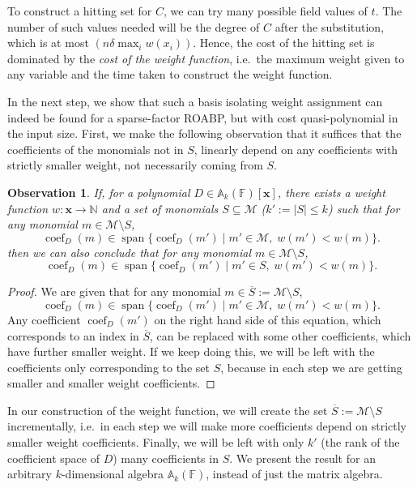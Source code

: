 \documentclass[final,oneeqnum, onethmnum, onefignum]{siamltex1213}
\newcommand{\N}{\mathbb N}
\newcommand{\A}{\mathbb A}
\newcommand{\F}{\mathbb F}
\newcommand{\abs}[1]{\lvert #1 \rvert}
\newcommand{\M}{\mathcal M}
\newcommand{\degree}{\delta} %
\newcommand{\coeff}{\operatorname{coef}}
\DeclareMathOperator{\Span}{span}
\newcommand{\x}{\mathbf{x}}
\renewcommand{\o}[1]{\overline{#1}}
\newtheorem{observation}[theorem]{Observation}
\begin{document}
To construct a hitting set for $C$, we can try many possible field values
of $t$. The number of such values needed will be the degree of $C$
after the substitution, which is at most $(n \degree \max_{i} w(x_i))$.
Hence, the cost of the hitting set is dominated by the 
{\em cost of the weight function}, i.e.\ the maximum weight given to any variable
and the time taken to construct the weight function.

In the next step, we show that such a basis isolating weight assignment
can indeed be found for a sparse-factor ROABP,
but with cost quasi-polynomial in the input size. 
First, we make the following observation that
it suffices that the coefficients of the monomials not in $S$,
linearly depend on any coefficients with strictly smaller weight, not
necessarily coming from $S$. 

\begin{observation}
\label{obs:smallerWeight}
If, for a polynomial $D \in \A_k(\F)[\x]$, there exists 
a weight function $w \colon \mathbf{x} \to \N$ 
and a set of monomials $S \subseteq \M$ ($k' := \abs{S} \leq k$)
such that 
for any monomial $m \in \M \setminus S$, 
$$ \coeff_D(m) \in \Span \{ \coeff_D(m') \mid m' \in \M , \; w(m') < w({m}) \}.$$
then
we can also conclude that
for any monomial $m \in \M \setminus S$, 
$$ \coeff_D(m) \in \Span \{ \coeff_D(m') \mid m' \in S, \; w(m') < w({m}) \}.$$
\end{observation}
\begin{proof}
We are given that for any monomial $m \in \o{S} := \M \setminus S$, 
$$ \coeff_D(m) \in \Span \{ \coeff_D(m') \mid m' \in \M, \; w(m') < w({m}) \}. $$
Any coefficient $\coeff_D({m'})$ on the right hand side of this equation, 
which corresponds to an index in $\o{S}$, 
can be replaced with some other coefficients, which have further
smaller weight.   
If we keep doing this, we will be left 
with the coefficients only corresponding to the set $S$, 
because in each step we are getting smaller and smaller weight coefficients. 
\end{proof}

In our construction of the weight function, 
we will create the set $\o{S} := \M \setminus S$ incrementally, i.e.\
in each step we will
make more coefficients depend on strictly smaller weight
coefficients.
Finally, we will be left with only $k'$ 
(the rank of the coefficient space of $D$) many coefficients in $S$.
We present the result for an arbitrary $k$-dimensional algebra $\A_k(\F)$,
 instead of just the matrix algebra.
\end{document}
